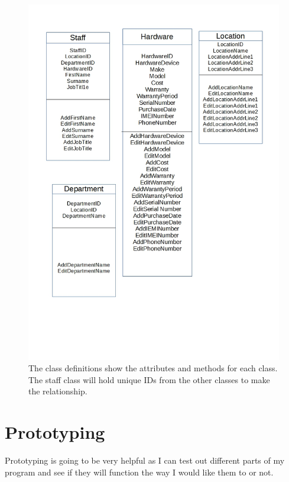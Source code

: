 \begin{figure}[H]
\hspace*{-1.3cm}
\vspace*{-1cm}
\includegraphics[width=1\textwidth]{ClassDefinitions.jpg}
\caption{The class definitions show the attributes and methods for each class. The staff class will hold unique IDs from the other classes to make the relationship.} \label{Class Definitions}
\end{figure}

\section{Prototyping}

Prototyping is going to be very helpful as I can test out different parts of my program and see if they will function the way I would like them to or not.

